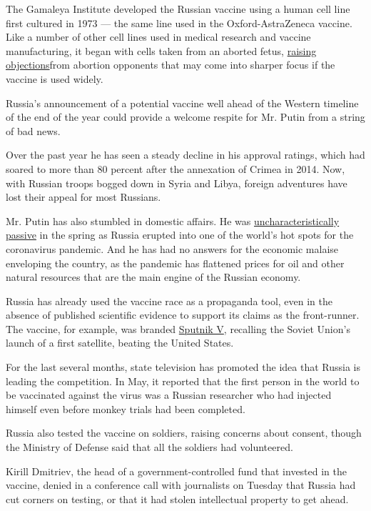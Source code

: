 The Gamaleya Institute developed the Russian vaccine using a human cell
line first cultured in 1973 --- the same line used in the
Oxford-AstraZeneca vaccine. Like a number of other cell lines used in
medical research and vaccine manufacturing, it began with cells taken
from an aborted fetus,
\href{https://www.sciencemag.org/sites/default/files/Canada-COVID-19\%20Vaccine\%20letter\%20May\%2021st\%202020_updated\%20\%28002\%29.pdf}{raising
objections}from abortion opponents that may come into sharper focus if
the vaccine is used widely.

Russia's announcement of a potential vaccine well ahead of the Western
timeline of the end of the year could provide a welcome respite for Mr.
Putin from a string of bad news.

Over the past year he has seen a steady decline in his approval ratings,
which had soared to more than 80 percent after the annexation of Crimea
in 2014. Now, with Russian troops bogged down in Syria and Libya,
foreign adventures have lost their appeal for most Russians.

Mr. Putin has also stumbled in domestic affairs. He was
\href{https://www.nytimes3xbfgragh.onion/2020/04/30/world/europe/russia-putin-coronavirus.html}{uncharacteristically
passive} in the spring as Russia erupted into one of the world's hot
spots for the coronavirus pandemic. And he has had no answers for the
economic malaise enveloping the country, as the pandemic has flattened
prices for oil and other natural resources that are the main engine of
the Russian economy.

Russia has already used the vaccine race as a propaganda tool, even in
the absence of published scientific evidence to support its claims as
the front-runner. The vaccine, for example, was branded
\href{https://sputnikvaccine.com/}{Sputnik V}, recalling the Soviet
Union's launch of a first satellite, beating the United States.

For the last several months, state television has promoted the idea that
Russia is leading the competition. In May, it reported that the first
person in the world to be vaccinated against the virus was a Russian
researcher who had injected himself even before monkey trials had been
completed.

Russia also tested the vaccine on soldiers, raising concerns about
consent, though the Ministry of Defense said that all the soldiers had
volunteered.

Kirill Dmitriev, the head of a government-controlled fund that invested
in the vaccine, denied in a conference call with journalists on Tuesday
that Russia had cut corners on testing, or that it had stolen
intellectual property to get ahead.

